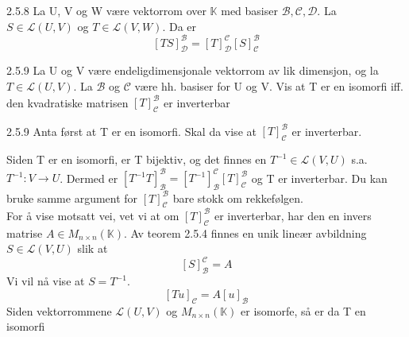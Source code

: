 \documentclass[a4paper,norsk]{article}
\begin{document}
\begin{propositionbox}{2.5.8}{}
La U, V og W være vektorrom over $ \mathbb{K} $ med basiser $ \mathcal{B}, \mathcal{C}, \mathcal{D} $. La $ S \in \mathcal{L} \left( U, V \right)  $  og $ T \in \mathcal{L} \left( V, W \right)  $. Da er
\[
    \left[ TS \right] _{\mathcal{D}}^{\mathcal{B}} = \left[ T \right] _{\mathcal{D}}^{\mathcal{C}} \left[ S \right] _{\mathcal{C}} ^{\mathcal{B}}
\]
\end{propositionbox}

\begin{oppgavebox}{2.5.9}{}
La U og V være endeligdimensjonale vektorrom av lik dimensjon, og la $ T \in  \mathcal{L} \left( U, V \right)  $. La $ \mathcal{B} $ og $ \mathcal{C} $ være hh. basiser for U og V. Vis at T er en isomorfi iff. den kvadratiske matrisen $ \left[ T \right] _{\mathcal{C}}^{\mathcal{B}} $ er inverterbar    

\begin{proofbox}{2.5.9}{}
Anta først at T er en isomorfi. Skal da vise at $ \left[ T \right] _{ \mathcal{C}}^{\mathcal{B}} $ er inverterbar.  

Siden T er en isomorfi, er T bijektiv, og det finnes en $ T^{-1} \in  \mathcal{L} \left( V, U \right) $ s.a. $ T^{-1} : V \rightarrow U $. Dermed er $ \left[ T^{-1} T \right] _{\mathcal{B}}^{\mathcal{B}} = \left[ T^{-1} \right]_{\mathcal{B}}^{\mathcal{C}} \left[ T \right] _{\mathcal{C}}^{\mathcal{B}}  $   og T er inverterbar. Du kan bruke samme argument for $ \left[ T \right] _{\mathcal{C}}^{\mathcal{B}} $ bare stokk om rekkefølgen.\\

For å vise motsatt vei, vet vi at om $\left[ T \right]_{\mathcal{C}}^{\mathcal{B}}$ er inverterbar, har den en invers matrise $A \in M_{n \times n}(\mathbb{K})$. Av teorem 2.5.4 finnes en unik lineær avbildning $S \in \mathcal{L}(V,U)$ slik at
\[
\left[ S \right]_{\mathcal{B}}^{\mathcal{C}} = A
\]
Vi vil nå vise at $S = T^{-1}$.
\[
    \left[  Tu \right] _ {\mathcal{C}} = A \left[ u \right] _ {\mathcal{B}}
\]
Siden vektorrommene $ \mathcal{L} \left( U, V \right)  $ og $ M_ {n \times n} (\mathbb{K}) $  er isomorfe, så er da T en isomorfi

\end{proofbox}
\end{oppgavebox}
\end{document}

